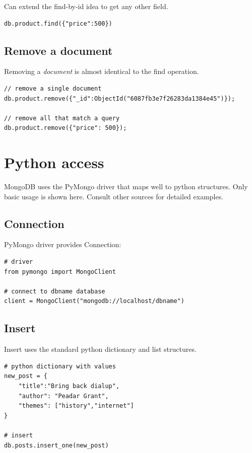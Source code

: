 \documentclass{pgnotes}
\begin{document}
Can extend the find-by-id idea to get any other field.
\begin{verbatim}
db.product.find({"price":500})
\end{verbatim}

\subsection{Remove a document}

Removing a \textit{document} is almost identical to the find operation.

\begin{verbatim}
// remove a single document
db.product.remove({"_id":ObjectId("6087fb3e7f26283da1384e45")});

// remove all that match a query
db.product.remove({"price": 500});
\end{verbatim}

\section{Python access}

MongoDB uses the PyMongo driver that maps well to python structures.
Only basic usage is shown here.
Consult other sources for detailed examples. 

\subsection{Connection}

PyMongo driver provides Connection:
\begin{verbatim}
# driver
from pymongo import MongoClient

# connect to dbname database
client = MongoClient("mongodb://localhost/dbname")
\end{verbatim}

\subsection{Insert}

Insert uses the standard python dictionary and list structures.

\begin{verbatim}
# python dictionary with values
new_post = {
    "title":"Bring back dialup",
    "author": "Peadar Grant",
    "themes": ["history","internet"]
}

# insert
db.posts.insert_one(new_post)
\end{verbatim}
\end{document}
